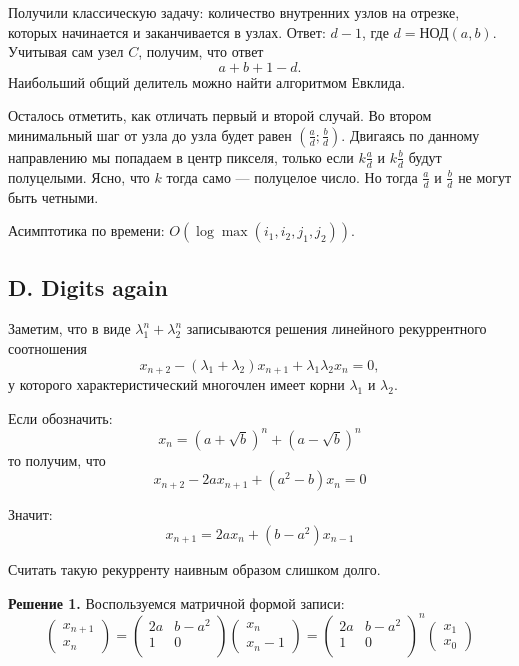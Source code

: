 \documentclass[10pt, a4paper]{article}
\begin{document}



Получили классическую задачу: количество внутренних узлов на отрезке, которых начинается и заканчивается в узлах. Ответ: $d - 1$, где $d = \text{НОД}(a, b)$. Учитывая сам узел $C$, получим, что ответ $$a + b + 1 - d.$$ Наибольший общий делитель можно найти алгоритмом Евклида.

Осталось отметить, как отличать первый и второй случай. Во втором минимальный шаг от узла до узла будет равен $\left(\frac{a}{d} ; \frac{b}{d} \right)$. Двигаясь по данному направлению мы попадаем в центр пикселя, только если $k \frac{a}{d}$ и $k \frac{b}{d}$ будут полуцелыми. Ясно, что $k$ тогда само --- полуцелое число. Но тогда $\frac{a}{d}$ и $\frac{b}{d}$ не могут быть четными.

Асимптотика по времени: $O(\log \max(i_1, i_2, j_1, j_2))$.




\subsection*{D. Digits again}

Заметим, что в виде $\lambda_1^n + \lambda_2^n$ записываются решения линейного рекуррентного соотношения
$$ x_{n+2} - (\lambda_1 + \lambda_2) x_{n+1} + \lambda_1 \lambda_2 x_{n} = 0,$$
у которого характеристический многочлен имеет корни $\lambda_1$ и $\lambda_2$. 

Если обозначить:
$$x_n = \left(a+\sqrt{b} \right)^n + \left(a - \sqrt{b} \right)^n$$
то получим, что 
$$x_{n+2} - 2 a x_{n+1} + (a^2 - b) x_n = 0$$

Значит:
$$x_{n+1} = 2 a x_{n} + (b - a^2) x_{n-1}$$

Считать такую рекурренту наивным образом слишком долго. 

\textbf{Решение 1.} Воспользуемся матричной формой записи:
$$
\begin{pmatrix}
x_{n+1} \\
x_{n}
\end{pmatrix}
=
\begin{pmatrix}
2 a & b - a^2 \\
1 & 0 \\
\end{pmatrix}
\begin{pmatrix}
x_{n} \\
x_{n}-1
\end{pmatrix}
=
\begin{pmatrix}
2 a & b - a^2 \\
1 & 0 \\
\end{pmatrix}^{n}
\begin{pmatrix}
x_{1} \\
x_{0}
\end{pmatrix}
$$
\end{document}
